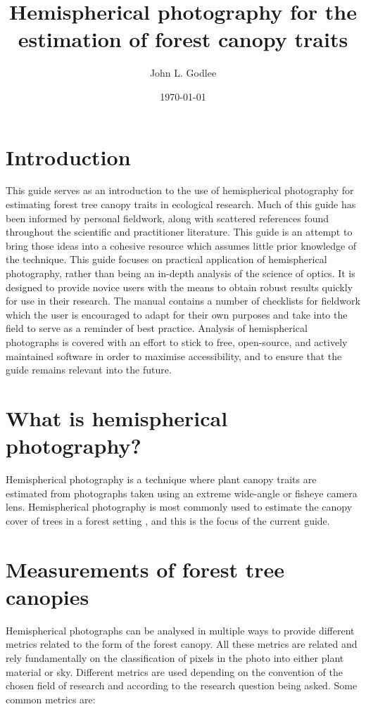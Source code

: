 \documentclass[11pt,a4paper]{article}
\title{Hemispherical photography for the estimation of forest canopy traits}
\date{\today}
\author{John L. Godlee}
\begin{document}
\maketitle

\tableofcontents
\newpage

\section{Introduction}

This guide serves as an introduction to the use of hemispherical photography for estimating forest tree canopy traits in ecological research. Much of this guide has been informed by personal fieldwork, along with scattered references found throughout the scientific and practitioner literature. This guide is an attempt to bring those ideas into a cohesive resource which assumes little prior knowledge of the technique. This guide focuses on practical application of hemispherical photography, rather than being an in-depth analysis of the science of optics. It is designed to provide novice users with the means to obtain robust results quickly for use in their research. The manual contains a number of checklists for fieldwork which the user is encouraged to adapt for their own purposes and take into the field to serve as a reminder of best practice. Analysis of hemispherical photographs is covered with an effort to stick to free, open-source, and actively maintained software in order to maximise accessibility, and to ensure that the guide remains relevant into the future.

\section{What is hemispherical photography?}

Hemispherical photography is a technique where plant canopy traits are estimated from photographs taken using an extreme wide-angle or fisheye camera lens. Hemispherical photography is most commonly used to estimate the canopy cover of trees in a forest setting \citep{Seidel2011, Macfarlane2014}, and this is the focus of the current guide. 
\section{Measurements of forest tree canopies}

Hemispherical photographs can be analysed in multiple ways to provide different metrics related to the form of the forest canopy. All these metrics are related and rely fundamentally on the classification of pixels in the photo into either plant material or sky. Different metrics are used depending on the convention of the chosen field of research and according to the research question being asked. Some common metrics are:
\end{document}
